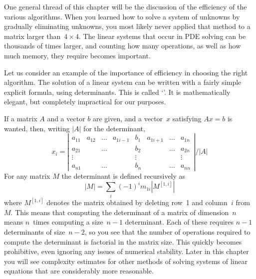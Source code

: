 One general thread of this chapter will be the discussion of the
efficiency of the various algorithms. When you learned how to solve a
system of unknowns by gradually eliminating unknowns, you most likely
never applied that method to a matrix larger than~$4\times4$. The
linear systems that occur in PDE solving can be thousands of times
larger, and counting how many operations, as well as how much memory,
they require becomes important.

Let us consider an example of the importance of efficiency in choosing
the right algorithm.
The solution of a linear system can be written with a fairly simple
explicit formula, using determinants. This is called
`'. It is mathematically elegant, but
completely impractical for our purposes.

If a matrix $A$ and a vector $b$ are given, and a vector~$x$
satisfying $Ax=b$ is wanted, then,
writing $|A|$ for the determinant,
  \[ x_i=\left|
    \begin{matrix}
      a_{11}&a_{12}&\ldots&a_{1i-1}&b_1&a_{1i+1}&\ldots&a_{1n}\\
      a_{21}&      &\ldots&        &b_2&        &\ldots&a_{2n}\\
      \vdots&      &      &        &\vdots&     &      &\vdots\\
      a_{n1}&      &\ldots&        &b_n&        &\ldots&a_{nn}
    \end{matrix}\right|
    / |A|
    \]
For any matrix $M$ the determinant is defined recursively as
\[ |M| = \sum_i (-1)^im_{1i}|M^{[1,i]}| \]
where $M^{[1,i]}$ denotes the matrix obtained by deleting row~1 and
column~$i$ from~$M$. This means that computing the determinant of a
matrix of dimension~$n$ means $n$~times computing a size~$n-1$
determinant. Each of these requires $n-1$ determinants of size~$n-2$, so
you see that the number of operations
required to compute the determinant is factorial in the matrix
size. This quickly becomes prohibitive, even ignoring any issues of
numerical stability.
Later in this chapter you will see complexity estimates for other
methods of solving systems of linear equations that are considerably
more reasonable.

